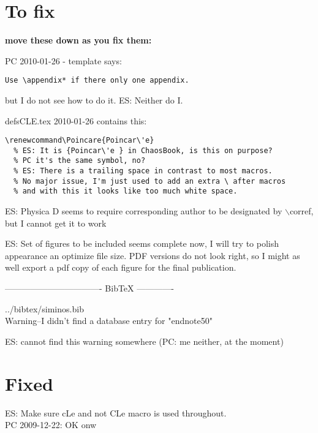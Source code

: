 
\section{To fix}

{\bf move these down as you fix them:}

PC 2010-01-26 - template says:
\begin{verbatim}
Use \appendix* if there only one appendix.
\end{verbatim}
but I do not see how to do it.
ES: Neither do I.

defsCLE.tex  2010-01-26 contains this:
\begin{verbatim}
\renewcommand\Poincare{Poincar\'e}
  % ES: It is {Poincar\'e } in ChaosBook, is this on purpose?
  % PC it's the same symbol, no?
  % ES: There is a trailing space in contrast to most macros.
  % No major issue, I'm just used to add an extra \ after macros
  % and with this it looks like too much white space.
\end{verbatim}

ES: Physica D seems to require corresponding author to be
designated by $\backslash$corref, but I cannot get it to work

ES: Set of figures to be included seems complete now, I will
try to polish appearance an optimize file size. PDF versions
do not look right, so I might as well export a pdf copy of
each figure for the final publication.


---------------------------------- BibTeX -------------

../bibtex/siminos.bib
\\
Warning--I didn't find a database entry for "endnote50"

ES: cannot find this warning somewhere
(PC: me neither, at the moment)

\section*{Fixed}

ES: Make sure cLe and not CLe macro is used throughout.
\\
PC 2009-12-22: OK onw
